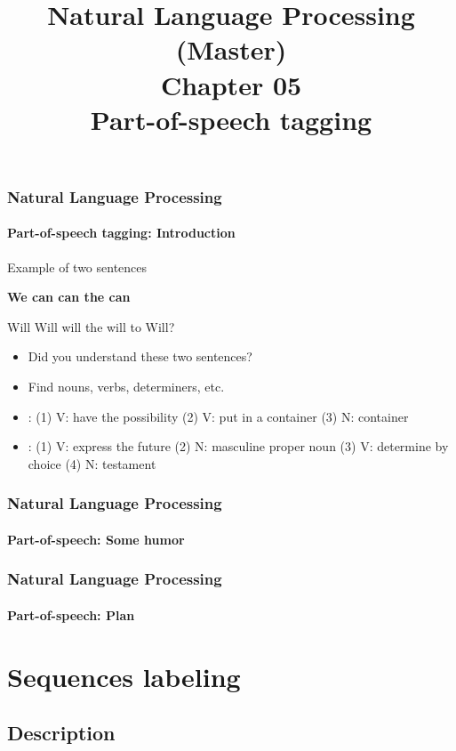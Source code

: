 \documentclass[xcolor=table]{beamer}
\title[ESI - NLP: 05(master)- PoS tagging]%
{Natural Language Processing (Master)\\Chapter 05\\Part-of-speech tagging}
\begin{document}
	
\begin{frame}
\frametitle{Natural Language Processing}
\framesubtitle{Part-of-speech tagging: Introduction}

\begin{exampleblock}{Example of two sentences}
	\begin{center}
		\Huge\bfseries
		We can can the can
		
		Will Will will the will to Will?
	\end{center}
\end{exampleblock}

\begin{itemize}
	\item Did you understand these two sentences?
	\item Find nouns, verbs, determiners, etc.
	\item {}: (1) V: have the possibility (2) V: put in a container (3) N: container
	\item {}: (1) V: express the future (2) N: masculine proper noun (3) V: determine by choice (4) N: testament
\end{itemize}

\end{frame}

\begin{frame}
\frametitle{Natural Language Processing}
\framesubtitle{Part-of-speech: Some humor}

\begin{center}
\end{center}

\end{frame}

\begin{frame}
\frametitle{Natural Language Processing}
\framesubtitle{Part-of-speech: Plan}

\begin{multicols}{2}
\tableofcontents
\end{multicols}
\end{frame}

\section{Sequences labeling}

\subsection{Description}
\end{document}
